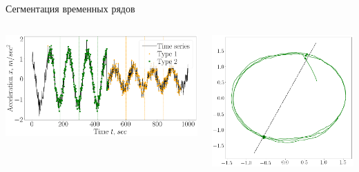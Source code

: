\documentclass[10pt,pdf,hyperref={unicode}]{beamer}
\begin{document}
\begin{frame}[shrink=5]{Сегментация временных рядов}
\justifying

\begin{columns}
    \begin{column}{0.5\textwidth}
        \includegraphics[width=1\textwidth]{results/simple_1_segmentation_vector}
    \end{column}
    \begin{column}{0.3\textwidth}
        \includegraphics[width=1\textwidth]{results/simple_1_phase_space1}
    \end{column}
\end{columns}


\end{frame}
\end{document}
